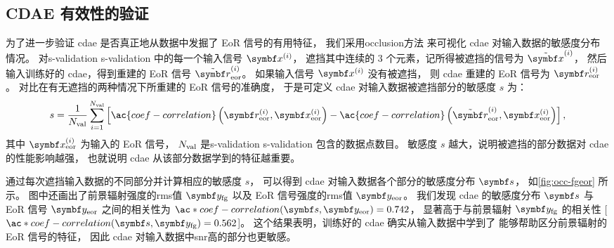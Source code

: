 \subsection{CDAE 有效性的验证}
\label{sec:cdae-validation}

为了进一步验证 \ac{cdae} 是否真正地从数据中发掘了 EoR 信号的有用特征，
我们采用\ac{occlusion}方法\cite{zeiler2014}
来可视化 \ac{cdae} 对输入数据的敏感度分布情况。
对\acl{s-validation} \ac{s-validation} 中的每一个输入信号 $\B{x}^{(i)}$，
遮挡其中连续的 3 个元素，记所得被遮挡的信号为 $\tilde{\B{x}}^{(i)}$，
然后输入训练好的 \ac{cdae}，得到重建的 EoR 信号 $\tilde{\B{r}}^{(i)}_{\R{eor}}$。
如果输入信号 $\B{x}^{(i)}$ 没有被遮挡，
则 \ac{cdae} 重建的 EoR 信号为 $\B{r}^{(i)}_{\R{eor}}$。
对比在有无遮挡的两种情况下所重建的 EoR 信号的准确度，
于是可定义 \ac{cdae} 对输入数据被遮挡部分的敏感度 $s$ 为：
\begin{equation}
  \label{eq:perf-loss}
  s = \frac{1}{N_{\R{val}}} \sum_{i=1}^{N_{\R{val}}} \left[
      \ac{coef-correlation} \left(
        \B{r}^{(i)}_{\R{eor}}, \B{x}^{(i)}_{\R{eor}}
      \right) -
      \ac{coef-correlation} \left(
        \tilde{\B{r}}^{(i)}_{\R{eor}}, \B{x}^{(i)}_{\R{eor}}
      \right)
    \right] ,
\end{equation}
其中 $\B{x}^{(i)}_{\R{eor}}$ 为输入的 EoR 信号，
$N_{\mathrm{val}}$ 是\acl{s-validation} \ac{s-validation} 包含的数据点数目。
敏感度 $s$ 越大，说明被遮挡的部分数据对 \ac{cdae} 的性能影响越强，
也就说明 \ac{cdae} 从该部分数据学到的特征越重要。

通过每次遮挡输入数据的不同部分并计算相应的敏感度 $s$，
可以得到 \ac{cdae} 对输入数据各个部分的敏感度分布 $\B{s}$，
如\autoref{fig:occ-fgeor} 所示。
图中还画出了前景辐射强度的\acs*{rms}值 $\B{y}_{\R{fg}}$
以及 EoR 信号强度的\acs*{rms}值 $\B{y}_{\R{eor}}$。
我们发现 \ac{cdae} 的敏感度分布 $\B{s}$ 与 EoR 信号 $\B{y}_{\R{eor}}$
之间的相关性为 $\ac*{coef-correlation}(\B{s}, \B{y}_{\R{eor}}) = 0.742$，
显著高于与前景辐射 $\B{y}_{\R{fg}}$ 的相关性
[$\ac*{coef-correlation}(\B{s}, \B{y}_{\R{fg}}) = 0.562$]。
这个结果表明，训练好的 \ac{cdae} 确实从输入数据中学到了
能够帮助区分前景辐射的 EoR 信号的特征，
因此 \ac{cdae} 对输入数据中\ac{snr}高的部分也更敏感。

